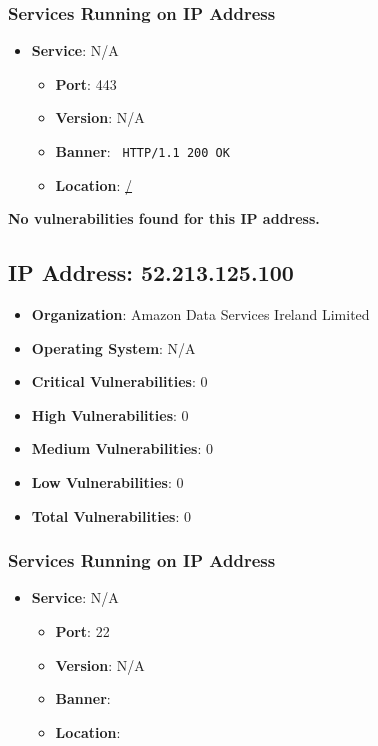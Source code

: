 \documentclass{article}
\begin{document}
\subsubsection*{Services Running on IP Address}

\begin{itemize}
    
        \item \textbf{Service}: N/A
        \begin{itemize}
            \item \textbf{Port}: 443
            \item \textbf{Version}:  N/A 
            \item \textbf{Banner}: \texttt{ HTTP/1.1 200 OK
 }
            \item \textbf{Location}: \href{ / }{ / }
        \end{itemize}
    
\end{itemize}


\textbf{No vulnerabilities found for this IP address.}


\clearpage



\subsection*{IP Address: 52.213.125.100}

\begin{itemize}
    \item \textbf{Organization}: Amazon Data Services Ireland Limited
    \item \textbf{Operating System}:  N/A 
    \item \textbf{Critical Vulnerabilities}: 0
    \item \textbf{High Vulnerabilities}: 0
    \item \textbf{Medium Vulnerabilities}: 0
    \item \textbf{Low Vulnerabilities}: 0
    \item \textbf{Total Vulnerabilities}: 0
\end{itemize}

\subsubsection*{Services Running on IP Address}

\begin{itemize}
    
        \item \textbf{Service}: N/A
        \begin{itemize}
            \item \textbf{Port}: 22
            \item \textbf{Version}:  N/A 
            \item \textbf{Banner}: \texttt{  }
            \item \textbf{Location}: \href{  }{  }
        \end{itemize}
    
\end{itemize}
\end{document}
